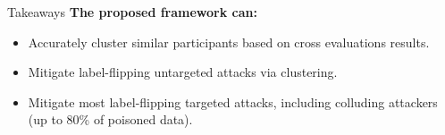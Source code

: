 
\begin{frame}{Takeaways}
  \textbf{The proposed framework can:}
  \begin{itemize}
    \item Accurately cluster similar participants based on cross evaluations results.
    \item Mitigate label-flipping untargeted attacks via clustering.
    \item Mitigate most label-flipping targeted attacks, including colluding attackers (up to 80\% of poisoned data).
  \end{itemize}

\end{frame}